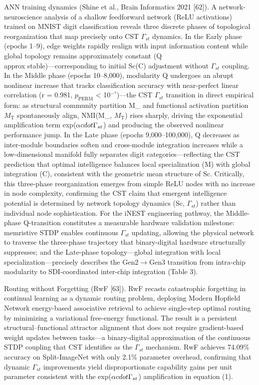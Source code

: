 \documentclass[a4paper,12pt]{article}
\begin{document}
ANN training dynamics (Shine et al., Brain Informatics 2021 [62]). A network-neuroscience analysis of a shallow feedforward network (ReLU activations) trained on MNIST digit classification reveals three discrete phases of topological reorganization that map precisely onto CST $\Gamma_{st}$ dynamics. In the Early phase (epochs 1--9), edge weights rapidly realign with input information content while global topology remains approximately constant (Q  \\approx  stable)---corresponding to initial Sc(C) adjustment without $\Gamma_{st}$ coupling. In the Middle phase (epochs 10--8,000), modularity Q undergoes an abrupt nonlinear increase that tracks classification accuracy with near-perfect linear correlation (r = 0.981, $p_{\text{PERM}}$ < 10$^{-}^4$)---the CST $\Gamma_{st}$ transition in direct empirical form: as structural community partition M_{} and functional activation partition $M_{\text{T}}$ spontaneously align, NMI(M_{}, $M_{\text{T}}$) rises sharply, driving the exponential amplification term exp($\alpha \\cdot \Gamma_{st}$) and producing the observed nonlinear performance jump. In the Late phase (epochs 9,000--100,000), Q decreases as inter-module boundaries soften and cross-module integration increases while a low-dimensional manifold fully separates digit categories---reflecting the CST prediction that optimal intelligence balances local specialization (M) with global integration (C), consistent with the geometric mean structure of Sc. Critically, this three-phase reorganization emerges from simple ReLU nodes with no increase in node complexity, confirming the CST claim that emergent intelligence potential is determined by network topology dynamics (Sc, $\Gamma_{st}$) rather than individual node sophistication. For the iNEST engineering pathway, the Middle-phase Q-transition constitutes a measurable hardware validation milestone: memristive STDP enables continuous $\Gamma_{st}$ updating, allowing the physical network to traverse the three-phase trajectory that binary-digital hardware structurally suppresses; and the Late-phase topology---global integration with local specialization---precisely describes the Gen2$\rightarrow$Gen3 transition from intra-chip modularity to SDI-coordinated inter-chip integration (Table 3).


Routing without Forgetting (RwF [63]). RwF recasts catastrophic forgetting in continual learning as a dynamic routing problem, deploying Modern Hopfield Network energy-based associative retrieval to achieve single-step optimal routing by minimizing a variational free-energy functional. The result is a persistent structural--functional attractor alignment that does not require gradient-based weight updates between tasks---a binary-digital approximation of the continuous STDP coupling that CST identifies as the $\Gamma_{st}$ mechanism. RwF achieves 74.09\% accuracy on Split-ImageNet with only 2.1\% parameter overhead, confirming that dynamic $\Gamma_{st}$ improvements yield disproportionate capability gains per unit parameter consistent with the exp($\alpha \\cdot \Gamma_{st}$) amplification in equation (1).
\end{document}
